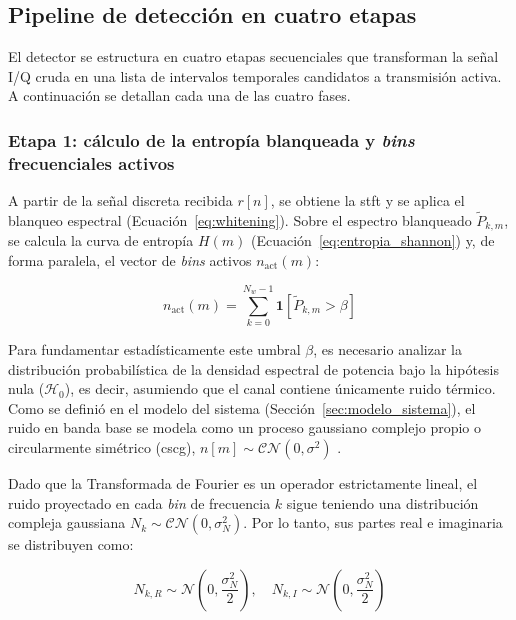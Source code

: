 \subsection{Pipeline de detección en cuatro etapas}
\label{subsec:pipeline_detector}

El detector se estructura en cuatro etapas secuenciales que transforman la señal I/Q cruda en una lista de intervalos temporales candidatos a transmisión activa. A continuación se detallan cada una de las cuatro fases.

\subsubsection{Etapa 1: cálculo de la entropía blanqueada y \textit{bins} frecuenciales activos}

A partir de la señal discreta recibida $r[n]$, se obtiene la \gls{stft} y se aplica el blanqueo espectral (Ecuación~\ref{eq:whitening}). Sobre el espectro blanqueado $\tilde{P}_{k,m}$, se calcula la curva de entropía $H(m)$ (Ecuación~\ref{eq:entropia_shannon}) y, de forma paralela, el vector de \textit{bins} activos $n_{\text{act}}(m)$:

\begin{equation}
    n_{\text{act}}(m) = \sum_{k=0}^{N_w-1} \mathbf{1}\!\left[\tilde{P}_{k,m} > \beta\right]
    \label{eq:bins_activos}
\end{equation}

Para fundamentar estadísticamente este umbral $\beta$, es necesario analizar la distribución probabilística de la densidad espectral de potencia bajo la hipótesis nula ($\mathcal{H}_0$), es decir, asumiendo que el canal contiene únicamente ruido térmico. Como se definió en el modelo del sistema (Sección~\ref{sec:modelo_sistema}), el ruido en banda base se modela como un proceso gaussiano complejo propio o circularmente simétrico (\gls{cscg}), $n[m] \sim \mathcal{CN}(0, \sigma^2)$ \cite{kay_fundamentals_1998}.

Dado que la Transformada de Fourier es un operador estrictamente lineal, el ruido proyectado en cada \textit{bin} de frecuencia $k$ sigue teniendo una distribución compleja gaussiana $N_k \sim \mathcal{CN}(0, \sigma_N^2)$. Por lo tanto, sus partes real e imaginaria se distribuyen como:

\begin{equation}
    N_{k,R} \sim \mathcal{N}\left(0, \frac{\sigma_N^2}{2}\right), \quad N_{k,I} \sim \mathcal{N}\left(0, \frac{\sigma_N^2}{2}\right)
\end{equation}

